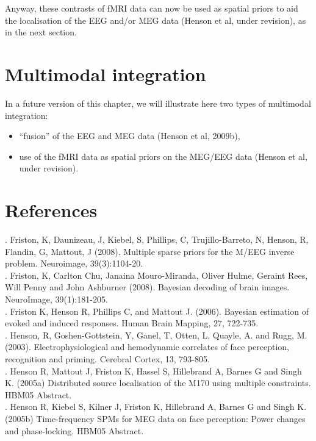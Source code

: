 Anyway, these contrasts of fMRI data can now be used as spatial priors to aid the localisation of the EEG and/or MEG data (Henson et al, under revision), as in the next section.

\section{Multimodal integration \label{multimodal:integration}}

In a future version of this chapter, we will illustrate here two types of multimodal integration:
\begin{itemize}
 \item ``fusion'' of the EEG and MEG data (Henson et al, 2009b),
 \item use of the fMRI data as spatial priors on the MEG/EEG data (Henson et al, under revision).
\end{itemize}

\section{References}

. Friston, K, Daunizeau, J, Kiebel, S, Phillips, C, Trujillo-Barreto, N, Henson, R, Flandin, G, Mattout, J (2008). Multiple sparse priors for the M/EEG inverse problem. Neuroimage, 39(3):1104-20.\\

. Friston, K, Carlton Chu, Janaina Mouro-Miranda, Oliver Hulme, Geraint Rees, Will Penny and John Ashburner (2008). Bayesian decoding of brain images. NeuroImage, 39(1):181-205.\\

. Friston K, Henson R, Phillips C, and Mattout J. (2006). Bayesian estimation of evoked and induced responses. Human Brain Mapping, 27, 722-735.\\

. Henson, R, Goshen-Gottstein, Y, Ganel, T, Otten, L, Quayle, A. and Rugg, M. (2003). Electrophysiological and hemodynamic correlates of face perception, recognition and priming. Cerebral Cortex, 13, 793-805.\\

. Henson R, Mattout J, Friston K, Hassel S, Hillebrand A, Barnes G and Singh K. (2005a) Distributed source localisation of the M170 using multiple constraints. HBM05 Abstract.\\

. Henson R, Kiebel S, Kilner J, Friston K, Hillebrand A, Barnes G and Singh K. (2005b) Time-frequency SPMs for MEG data on face perception: Power changes and phase-locking. HBM05 Abstract.\\

